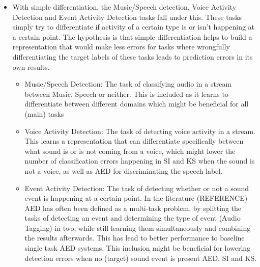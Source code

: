 	\begin{itemize}
		\item With simple differentiation, the Music/Speech detection, Voice Activity Detection and Event Activity Detection tasks fall under this. These tasks simply try to differentiate if activity of a certain type is or isn't happening at a certain point. The hypothesis is that simple differentiation helps to build a representation that would make less errors for tasks where wrongfully differentiating the target labels of these tasks leads to prediction errors in its own results. 
		\begin{itemize}
			\item Music/Speech Detection: The task of classifying audio in a stream between Music, Speech or neither. This is included as it learns to differentiate between different domains which might be beneficial for all (main) tasks
			\item Voice Activity Detection: The task of detecting voice activity in a stream. This learns a representation that can differentiate specifically between what sound is or is not coming from a voice, which might lower the number of classification errors happening in SI and KS when the sound is not a voice, as well as AED for discriminating the speech label.
			\item Event Activity Detection: The task of detecting whether or not a sound event is happening at a certain point. In the literature (REFERENCE) AED has often been defined as a multi-task problem, by splitting the tasks of detecting an event and determining the type of event (Audio Tagging) in two, while still learning them simultaneously and combining the results afterwards. This has lead to better performance to baseline single task AED systems. This inclusion might be beneficial for lowering detection errors when no (target) sound event is present AED, SI and KS. 
		\end{itemize}
	

\end{itemize}
